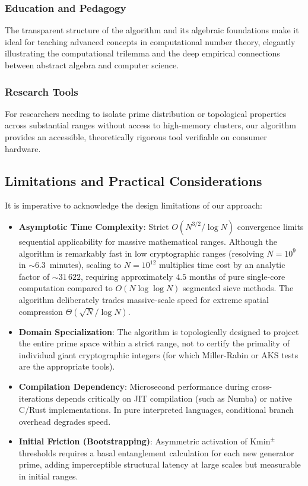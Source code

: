 \documentclass{article}
\numberwithin{equation}{section}
\theoremstyle{plain}
\theoremstyle{definition}
\begin{document}
\subsubsection{Education and Pedagogy}

The transparent structure of the algorithm and its algebraic foundations make it ideal for teaching advanced concepts in computational number theory, elegantly illustrating the computational trilemma and the deep empirical connections between abstract algebra and computer science.

\subsubsection{Research Tools}

For researchers needing to isolate prime distribution or topological properties across substantial ranges without access to high-memory clusters, our algorithm provides an accessible, theoretically rigorous tool verifiable on consumer hardware.

\subsection{Limitations and Practical Considerations}

It is imperative to acknowledge the design limitations of our approach:

\begin{itemize}
    \item \textbf{Asymptotic Time Complexity}: Strict $O(N^{3/2}/\log N)$ convergence limits sequential applicability for massive mathematical ranges. Although the algorithm is remarkably fast in low cryptographic ranges (resolving $N=10^9$ in $\sim 6.3$~minutes), scaling to $N=10^{12}$ multiplies time cost by an analytic factor of $\sim 31\,622$, requiring approximately $4.5$ months of pure single-core computation compared to $O(N \log \log N)$ segmented sieve methods. The algorithm deliberately trades massive-scale speed for extreme spatial compression $\Theta(\sqrt{N}/\log N)$.
    \item \textbf{Domain Specialization}: The algorithm is topologically designed to project the entire prime space within a strict range, not to certify the primality of individual giant cryptographic integers (for which Miller-Rabin or AKS tests are the appropriate tools).
    \item \textbf{Compilation Dependency}: Microsecond performance during cross-iterations depends critically on JIT compilation (such as Numba) or native C/Rust implementations. In pure interpreted languages, conditional branch overhead degrades speed.
    \item \textbf{Initial Friction (Bootstrapping)}: Asymmetric activation of $\mathrm{Kmin}^\pm$ thresholds requires a basal entanglement calculation for each new generator prime, adding imperceptible structural latency at large scales but measurable in initial ranges.
\end{itemize}
\end{document}
